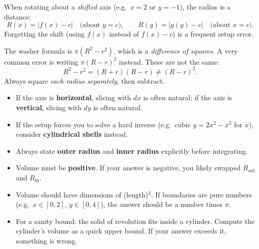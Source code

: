 \begin{commonmistake}[title={Common Mistake: Wrong Radius (Distance to the Axis)}]
When rotating about a \emph{shifted} axis (e.g.\ $x=2$ or $y=-1$), the radius is a distance:
\[
R(x)=|f(x)-c|\quad\text{(about }y=c),\qquad
R(y)=|g(y)-c|\quad\text{(about }x=c).
\]
Forgetting the shift (using $f(x)$ instead of $f(x)-c$) is a frequent setup error.
\end{commonmistake}

\begin{commonmistake}[title={Common Mistake: Squaring a difference vs.\ difference of squares}]
The washer formula is $\pi(R^2-r^2)$, which is a \emph{difference of squares}. A very common error is writing $\pi(R-r)^2$ instead. These are not the same:
\[
R^2-r^2=(R+r)(R-r) \neq (R-r)^2.
\]
Always square \emph{each radius separately}, then subtract.
\end{commonmistake}

\begin{examtip}[title={Exam Focus: Disk/Washer Method Selection}]
\begin{itemize}[leftmargin=*]
\item If the axis is \textbf{horizontal}, slicing with $dx$ is often natural; if the axis is \textbf{vertical}, slicing with $dy$ is often natural.
\item If the setup forces you to solve a hard inverse (e.g.\ cubic $y=2x^2-x^3$ for $x$), consider \textbf{cylindrical shells} instead.
\item Always state \textbf{outer radius} and \textbf{inner radius} explicitly before integrating.
\end{itemize}
\end{examtip}

\begin{examtip}[title={Exam Focus: Quick dimensional/sign sanity checks for volumes}]
\begin{itemize}[leftmargin=*]
\item Volume must be \textbf{positive}. If your answer is negative, you likely swapped $R_{\text{out}}$ and $R_{\text{in}}$.
\item Volume should have dimensions of (length)$^3$. If boundaries are pure numbers (e.g.\ $x\in[0,2]$, $y\in[0,4]$), the answer should be a number times $\pi$.
\item For a sanity bound: the solid of revolution fits inside a cylinder. Compute the cylinder's volume as a quick upper bound. If your answer exceeds it, something is wrong.
\end{itemize}
\end{examtip}

